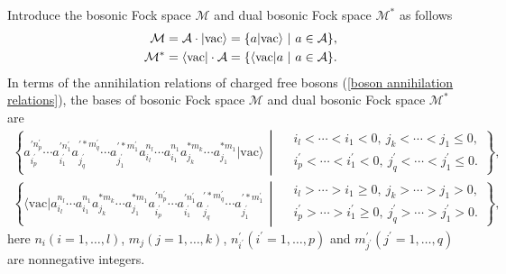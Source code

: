 \documentclass[10pt,a4paper]{amsart}
\numberwithin{equation}{section}
\begin{document}
Introduce the bosonic Fock space $\mathcal{M}$ and dual bosonic Fock space $\mathcal{M}^{\ast}$ as follows
\begin{eqnarray}
&&\mathcal{M}=\mathcal{A}\cdot|\text{vac}\rangle=\{a|\text{vac}
\rangle\ |\ a\in\mathcal{A}\},\notag\\
&&\mathcal{M}^{\ast}=\langle\text{vac}|\cdot\mathcal{A}=\{\langle\text{vac}
|a\ |\ a\in\mathcal{A}\}.
\end{eqnarray}
In terms of the annihilation relations of charged free bosons (\ref{boson annihilation relations}), the bases of bosonic Fock space $\mathcal{M}$ and dual bosonic Fock space $\mathcal{M}^{\ast}$ are
\begin{align}
\left\{a^{\prime n^{\prime}_{p}}_{i_{p}^{\prime}}
\cdots a^{\prime n^{\prime}_{1}}_{i_{1}^{\prime}}a^{\prime\ast m^{\prime}_{q}}_{j_{q}^{\prime}}
\cdots a^{\prime\ast m^{\prime}_{1}}_{j_{1}^{\prime}}a^{n_{l}}_{i_{l}}\cdots a^{n_{1}}_{i_{1}}
a^{\ast m_{k}}_{j_{k}}\cdots a^{\ast m_{1}}_{j_{1}}|\text{vac}\rangle\,\middle|\, %
    \begin{aligned}
        & i_{l} < \cdots < i_{1} < 0,\ j_{k} < \cdots < j_{1} \leq 0, \\
        & i^{\prime}_{p} < \cdots < i^{\prime}_{1} < 0,\ j^{\prime}_{q} < \cdots < j^{\prime}_{1} \leq 0.
    \end{aligned}\right\},
\end{align}
\begin{align}
\left\{\langle\text{vac}|a^{n_{l}}_{i_{l}}\cdots a^{n_{1}}_{i_{1}}
a^{\ast m_{k}}_{j_{k}}\cdots a^{\ast m_{1}}_{j_{1}}a^{\prime n^{\prime}_{p}}_{i_{p}^{\prime}}
\cdots a^{\prime n^{\prime}_{1}}_{i_{1}^{\prime}} a^{\prime\ast m^{\prime}_{q}}_{j_{q}^{\prime}}
\cdots a^{\prime\ast m^{\prime}_{1}}_{j_{1}^{\prime}}\,\middle|\, %
    \begin{aligned}
        & i_{l} > \cdots > i_{1} \geq 0,\ j_{k} > \cdots > j_{1} > 0, \\
        & i^{\prime}_{p} > \cdots > i^{\prime}_{1} \geq 0,\ j^{\prime}_{q} > \cdots > j^{\prime}_{1} > 0.
    \end{aligned}\right\},
\end{align}
here $n_i(i=1,\ldots,l)$, $m_{j}(j=1,\ldots,k)$, $n^{\prime}_{i^{\prime}}(i^{\prime}=1,\ldots,p)$ and $m^{\prime}_{j^{\prime}}(j^{\prime}=1,\ldots,q)$ are nonnegative integers.
\end{document}
